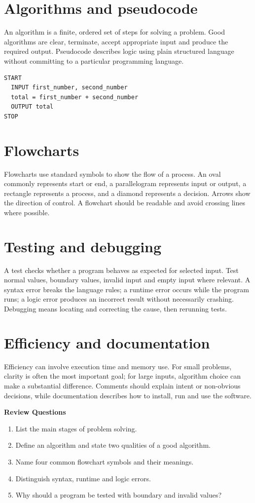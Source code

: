 \documentclass[11pt,openany,oneside]{book}
\newcommand{\reviewtitle}{\par\noindent\textbf{\color{Navy}Review Questions}\par}
\begin{document}
\section{Algorithms and pseudocode}
An algorithm is a finite, ordered set of steps for solving a problem. Good algorithms are clear, terminate, accept appropriate input and produce the required output. Pseudocode describes logic using plain structured language without committing to a particular programming language.

\begin{lstlisting}[style=webcode,language=Pseudo]
START
  INPUT first_number, second_number
  total = first_number + second_number
  OUTPUT total
STOP
\end{lstlisting}

\section{Flowcharts}
Flowcharts use standard symbols to show the flow of a process. An oval commonly represents start or end, a parallelogram represents input or output, a rectangle represents a process, and a diamond represents a decision. Arrows show the direction of control. A flowchart should be readable and avoid crossing lines where possible.

\section{Testing and debugging}
A test checks whether a program behaves as expected for selected input. Test normal values, boundary values, invalid input and empty input where relevant. A syntax error breaks the language rules; a runtime error occurs while the program runs; a logic error produces an incorrect result without necessarily crashing. Debugging means locating and correcting the cause, then rerunning tests.

\section{Efficiency and documentation}
Efficiency can involve execution time and memory use. For small problems, clarity is often the most important goal; for large inputs, algorithm choice can make a substantial difference. Comments should explain intent or non-obvious decisions, while documentation describes how to install, run and use the software.

\reviewtitle
\begin{enumerate}
\item List the main stages of problem solving.
\item Define an algorithm and state two qualities of a good algorithm.
\item Name four common flowchart symbols and their meanings.
\item Distinguish syntax, runtime and logic errors.
\item Why should a program be tested with boundary and invalid values?
\end{enumerate}
\end{document}
